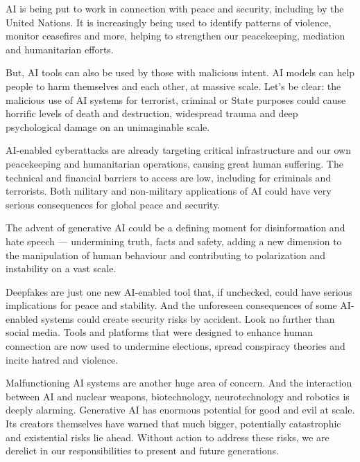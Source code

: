 {AI is being put to work in connection with peace and security, including by the United Nations. It is increasingly being used to identify patterns of violence, monitor ceasefires and more, helping to strengthen our peacekeeping, mediation and humanitarian efforts.\par
But, AI tools can also be used by those with malicious intent. AI models can help people to harm themselves and each other, at massive scale. Let’s be clear: the malicious use of AI systems for terrorist, criminal or State purposes could cause horrific levels of death and destruction, widespread trauma and deep psychological damage on an unimaginable scale.\par
AI-enabled cyberattacks are already targeting critical infrastructure and our own peacekeeping and humanitarian operations, causing great human suffering. The technical and financial barriers to access are low, including for criminals and terrorists. Both military and non-military applications of AI could have very serious consequences for global peace and security.\par
The advent of generative AI could be a defining moment for disinformation and hate speech — undermining truth, facts and safety, adding a new dimension to the manipulation of human behaviour and contributing to polarization and instability on a vast scale.\par
Deepfakes are just one new AI-enabled tool that, if unchecked, could have serious implications for peace and stability. And the unforeseen consequences of some AI-enabled systems could create security risks by accident. Look no further than social media. Tools and platforms that were designed to enhance human connection are now used to undermine elections, spread conspiracy theories and incite hatred and violence.\par
Malfunctioning AI systems are another huge area of concern. And the interaction between AI and nuclear weapons, biotechnology, neurotechnology and robotics is deeply alarming. Generative AI has enormous potential for good and evil at scale. Its creators themselves have warned that much bigger, potentially catastrophic and existential risks lie ahead. Without action to address these risks, we are derelict in our responsibilities to present and future generations.\par
}
